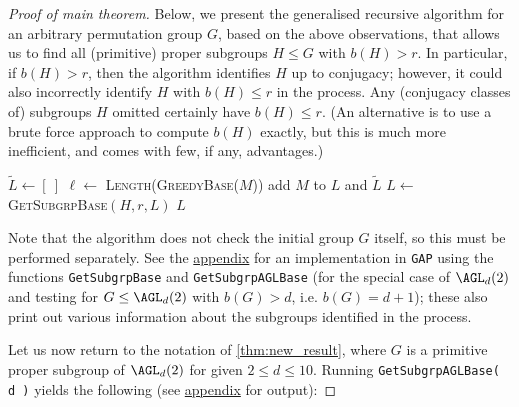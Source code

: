 \begin{proof}[Proof of main theorem]
    Below, we present the generalised recursive algorithm for an arbitrary permutation group $G$, based on the above observations, that allows us to find all (primitive) proper subgroups $H \leq G$ with $b(H) > r$. In particular, if $b(H) > r$, then the algorithm identifies $H$ up to conjugacy; however, it could also incorrectly identify $H$ with $b(H) \leq r$ in the process. Any (conjugacy classes of) subgroups $H$ omitted certainly have $b(H) \leq r$. (An alternative is to use a brute force approach to compute $b(H)$ exactly, but this is much more inefficient, and comes with few, if any, advantages.)

    \begin{algorithmic}[1]
        \State $\tilde L \gets [\ ]$
         $\ell \gets$ \textsc{Length}(\textsc{GreedyBase}($M$))
         add $M$ to $L$ and $\tilde L$
        \EndIf
        \EndIf
        \EndFor
        \State $L \gets$ \textsc{GetSubgrpBase}$(H,r,L)$
        \EndFor
        \State \Return $L$
        \EndProcedure
    \end{algorithmic}

    Note that the algorithm does not check the initial group $G$ itself, so this must be performed separately. See the \hyperref[app:subgrps_base_len]{appendix} for an implementation in \texttt{GAP} using the functions \texttt{GetSubgrpBase} and \texttt{GetSubgrpAGLBase} (for the special case of $\AGL_d(2)$ and testing for $G \leq \AGL_d(2)$ with $b(G) > d$, i.e. $b(G) = d + 1$); these also print out various information about the subgroups identified in the process.

    Let us now return to the notation of \autoref{thm:new_result}, where $G$ is a primitive proper subgroup of $\AGL_d(2)$ for given $2 \leq d \leq 10$. Running \texttt{GetSubgrpAGLBase( d )} yields the following (see \hyperref[app:agl_output]{appendix} for output):


\end{proof}
